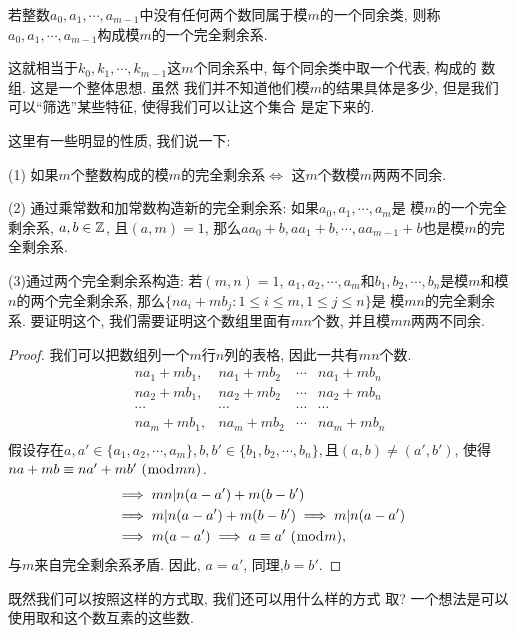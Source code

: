 \begin{definition}[完全剩余系]
    若整数$a_0, a_1, \cdots, a_{m-1}$中没有任何两个数同属于模$m$的一个同余类, 则称
    $a_0, a_1, \cdots, a_{m-1}$构成模$m$的一个完全剩余系. 
\end{definition}

这就相当于$k_0, k_1, \cdots, k_{m-1}$这$m$个同余系中, 每个同余类中取一个代表, 构成的
数组.  这是一个整体思想. 虽然
我们并不知道他们模$m$的结果具体是多少, 但是我们可以``筛选''某些特征, 使得我们可以让这个集合
是定下来的. 

这里有一些明显的性质, 我们说一下: 

(1) 如果$m$个整数构成的模$m$的完全剩余系$\iff$ 这$m$个数模$m$两两不同余. 

(2) 通过乘常数和加常数构造新的完全剩余系: 如果$a_0, a_1, \cdots, a_m$是
模$m$的一个完全剩余系, $a,b\in{\mathbb Z}$, 
且$(a,m)=1$, 那么$aa_0+b, aa_1+b, \cdots, aa_{m-1}+b$也是模$m$的完全剩余系. 

(3)通过两个完全剩余系构造: 若$(m,n)=1$, $a_1, a_2, \cdots, a_m$和$b_1,b_2, \cdots, 
b_n$是模$m$和模$n$的两个完全剩余系, 那么$\{na_i+mb_j:1\leq i\leq m, 1\leq j\leq n\}$是
模$mn$的完全剩余系. 要证明这个, 我们需要证明这个数组里面有$mn$个数, 并且模$mn$两两不同余. 

\begin{proof}
    我们可以把数组列一个$m$行$n$列的表格, 因此一共有$mn$个数. 
    $$\begin{array}{cccc}
        na_1+mb_1,&na_1+mb_2&\cdots&na_1+mb_n\\
        na_2+mb_1,&na_2+mb_2&\cdots&na_2+mb_n\\
        \cdots&\cdots&\cdots&\cdots\\
        na_m+mb_1,&na_m+mb_2&\cdots&na_m+mb_n\\
    \end{array}$$
    假设存在$a, a'\in \{a_1,
    a_2,\cdots, a_m\}, b, b'\in \{b_1, b_2,\cdots, b_n\}, $且$(a,b)\neq (a',b')$, 
    使得${na+mb} \equiv {na'+mb'} ~(\bmod {mn})$. 
    \begin{align*}
        &\implies mn | n(a-a')+m(b-b')\\
        & \implies m| n(a-a')+m(b-b') \implies m|n(a-a') \\
        & \implies m(a-a') \implies {a} \equiv {a'} ~(\bmod {m}), 
    \end{align*}
    与$m$来自完全剩余系矛盾. 因此, $a=a'$, 同理,$b=b'$.  
\end{proof}

 既然我们可以按照这样的方式取, 我们还可以用什么样的方式
取? 一个想法是可以使用取和这个数互素的这些数. 

